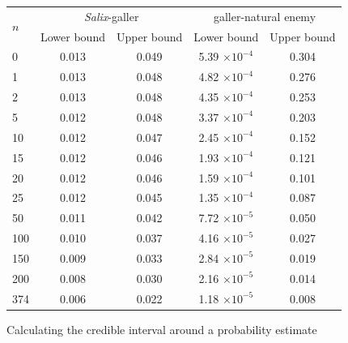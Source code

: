 \documentclass[12pt]{article}
\begin{document}
\begin{floatbox}{}
        \begin{tabular}{l  c c  c c }
        \multirow{2}{*}{$n$} & \multicolumn{2}{c}{\emph{Salix}-galler} & \multicolumn{2}{c}{galler-natural enemy}\\
         & Lower bound & Upper bound & Lower bound & Upper bound \\
        \hline
        0   & 0.013 & 0.049 & 5.39 $\times10^{-4}$ & 0.304 \\
        1   & 0.013 & 0.048 & 4.82 $\times10^{-4}$ & 0.276 \\
        2   & 0.013 & 0.048 & 4.35 $\times10^{-4}$ & 0.253 \\
        5   & 0.012 & 0.048 & 3.37 $\times10^{-4}$ & 0.203 \\
        10  & 0.012 & 0.047 & 2.45 $\times10^{-4}$ & 0.152 \\
        15  & 0.012 & 0.046 & 1.93 $\times10^{-4}$ & 0.121 \\
        20  & 0.012 & 0.046 & 1.59 $\times10^{-4}$ & 0.101 \\
        25  & 0.012 & 0.045 & 1.35 $\times10^{-4}$ & 0.087 \\
        50  & 0.011 & 0.042 & 7.72 $\times10^{-5}$ & 0.050 \\
        100 & 0.010 & 0.037 & 4.16 $\times10^{-5}$ & 0.027 \\
        150 & 0.009 & 0.033 & 2.84 $\times10^{-5}$ & 0.019 \\
        200 & 0.008 & 0.030 & 2.16 $\times10^{-5}$ & 0.014 \\
        \hline
        374 & 0.006 & 0.022 & 1.18 $\times10^{-5}$ & 0.008 \\
        \hline
        \end{tabular}

  \caption{Calculating the credible interval around a probability estimate}
  \label{box2}
\end{floatbox}
\end{document}

